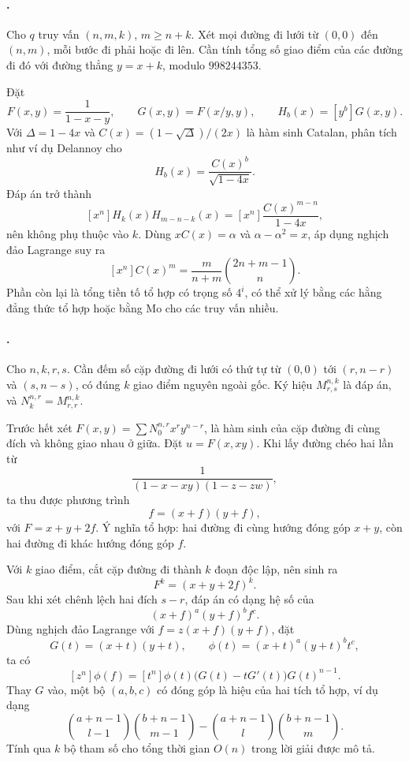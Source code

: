 \documentclass[11pt]{article}
\begin{document}
\paragraph{.}
Cho \(q\) truy vấn \((n,m,k)\), \(m\ge n+k\). Xét mọi đường đi lưới từ
\((0,0)\) đến \((n,m)\), mỗi bước đi phải hoặc đi lên. Cần tính tổng số giao
điểm của các đường đi đó với đường thẳng \(y=x+k\), modulo \(998244353\).

Đặt
\[
  F(x,y)=\frac{1}{1-x-y},\qquad G(x,y)=F(x/y,y),
  \qquad H_b(x)=[y^b]G(x,y).
\]
Với \(\Delta=1-4x\) và \(C(x)=(1-\sqrt{\Delta})/(2x)\) là hàm sinh Catalan,
phân tích như ví dụ Delannoy cho
\[
  H_b(x)=\frac{C(x)^b}{\sqrt{1-4x}}.
\]
Đáp án trở thành
\[
  [x^n]H_k(x)H_{m-n-k}(x)
  =
  [x^n]\frac{C(x)^{m-n}}{1-4x},
\]
nên không phụ thuộc vào \(k\). Dùng \(xC(x)=\alpha\) và
\(\alpha-\alpha^2=x\), áp dụng nghịch đảo Lagrange suy ra
\[
  [x^n]C(x)^m
  =
  \frac{m}{n+m}\binom{2n+m-1}{n}.
\]
Phần còn lại là tổng tiền tố tổ hợp có trọng số \(4^i\), có thể xử lý bằng
các hằng đẳng thức tổ hợp hoặc bằng Mo cho các truy vấn nhiều.

\paragraph{.}
Cho \(n,k,r,s\). Cần đếm số cặp đường đi lưới có thứ tự từ \((0,0)\) tới
\((r,n-r)\) và \((s,n-s)\), có đúng \(k\) giao điểm nguyên ngoài gốc. Ký hiệu
\(M_{r,s}^{n,k}\) là đáp án, và \(N_k^{n,r}=M_{r,r}^{n,k}\).

Trước hết xét \(F(x,y)=\sum N_0^{n,r}x^r y^{n-r}\), là hàm sinh của cặp đường
đi cùng đích và không giao nhau ở giữa. Đặt \(u=F(x,xy)\). Khi lấy đường chéo
hai lần từ
\[
  \frac{1}{(1-x-xy)(1-z-zw)},
\]
ta thu được phương trình
\[
  f=(x+f)(y+f),
\]
với \(F=x+y+2f\). Ý nghĩa tổ hợp: hai đường đi cùng hướng đóng góp \(x+y\),
còn hai đường đi khác hướng đóng góp \(f\).

Với \(k\) giao điểm, cắt cặp đường đi thành \(k\) đoạn độc lập, nên sinh ra
\[
  F^k=(x+y+2f)^k.
\]
Sau khi xét chênh lệch hai đích \(s-r\), đáp án có dạng hệ số của
\[
  (x+f)^a(y+f)^b f^c.
\]
Dùng nghịch đảo Lagrange với \(f=z(x+f)(y+f)\), đặt
\[
  G(t)=(x+t)(y+t),\qquad \phi(t)=(x+t)^a(y+t)^b t^c,
\]
ta có
\[
  [z^n]\phi(f)
  =
  [t^n]\phi(t)\bigl(G(t)-tG'(t)\bigr)G(t)^{n-1}.
\]
Thay \(G\) vào, một bộ \((a,b,c)\) có đóng góp là hiệu của hai tích tổ hợp,
ví dụ dạng
\[
  \binom{a+n-1}{l-1}\binom{b+n-1}{m-1}
  -
  \binom{a+n-1}{l}\binom{b+n-1}{m}.
\]
Tính qua \(k\) bộ tham số cho tổng thời gian \(O(n)\) trong lời giải được mô
tả.
\end{document}
